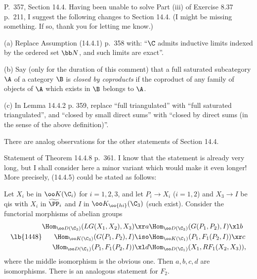 \documentclass[12pt]{article}
\theoremstyle{remark}
\theoremstyle{definition}
\begin{document}
%

\begin{s}%
P.~357, Section 14.4. Having been unable to solve Part (iii) of Exercise 8.37 p.~211, I suggest the following changes to Section 14.4. (I might be missing something. If so, thank you for letting me know.)

\nn(a) Replace Assumption (14.4.1) p.~358 with: ``$\C$ admits inductive limits indexed by the ordered set $\bb N$, and such limits are exact''.

\nn(b) Say (only for the duration of this comment) that a full saturated subcategory $\A$ of a category $\B$ is {\em closed by coproducts} if the coproduct of any family of objects of $\A$ which exists in $\B$ belongs to $\A$.

\nn(c) In Lemma 14.4.2 p. 359, replace ``full triangulated'' with ``full saturated triangulated'', and ``closed by small direct sums'' with ``closed by direct sums (in the sense of the above definition)''. 

There are analog observations for the other statements of Section 14.4.
\end{s}

%

\begin{s}%
Statement of Theorem 14.4.8 p.~361. I know that the statement is already very long, but I shall consider here a minor variant which would make it even longer! More precisely, (14.4.5) could be stated as follows:

Let $X_i$ be in $\oo K(\C_i)$ for $i=1,2,3$, and let $P_i\to X_i$ ($i=1,2$) and $X_3\to I$ be qis with $X_i$ in $\widetilde\PP_i$ and $I$ in $\oo K_{\oo{hi}}(\C_3)$ (such exist). Consider the functorial morphisms of abelian groups
\begin{equation}\lb{1448}
\begin{split}
\Hom_{\oo D(\C_3)}(LG(X_1,X_2),X_3)&\xr a\Hom_{\oo D(\C_3)}(G(P_1,P_2),I)\xl b\\ 
\Hom_{\oo K(\C_3)}(G(P_1,P_2),I)&\iso\Hom_{\oo K(\C_1)}(P_1,F_1(P_2,I))\xr c\\ 
\Hom_{\oo D(\C_1)}(P_1,F_1(P_2,I))&\xl d\Hom_{\oo D(\C_1)}(X_1,RF_1(X_2,X_3)),
\end{split}
\end{equation}
where the middle isomorphism is the obvious one. Then $a,b,c,d$ are isomorphisms. There is an analogous statement for $F_2$.
\end{s}

%
\end{document}

